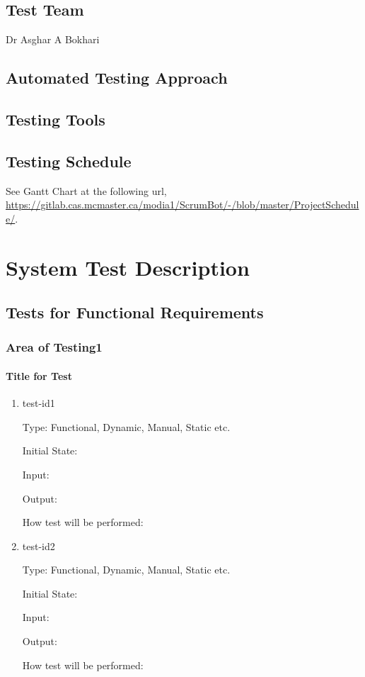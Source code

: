 \documentclass[12pt, titlepage]{article}
\begin{document}
\subsection{Test Team}
Dr Asghar A Bokhari

\subsection{Automated Testing Approach}


\subsection{Testing Tools}


\subsection{Testing Schedule}
See Gantt Chart at the following url, \url{https://gitlab.cas.mcmaster.ca/modia1/ScrumBot/-/blob/master/ProjectSchedule/}.

\section{System Test Description}
    
\subsection{Tests for Functional Requirements}

\subsubsection{Area of Testing1}
        
\paragraph{Title for Test}

\begin{enumerate}

\item{test-id1\\}

Type: Functional, Dynamic, Manual, Static etc.
                    
Initial State: 
                    
Input: 
                    
Output: 
                    
How test will be performed: 
                    
\item{test-id2\\}

Type: Functional, Dynamic, Manual, Static etc.
                    
Initial State: 
                    
Input: 
                    
Output: 
                    
How test will be performed: 

\end{enumerate}
\end{document}
